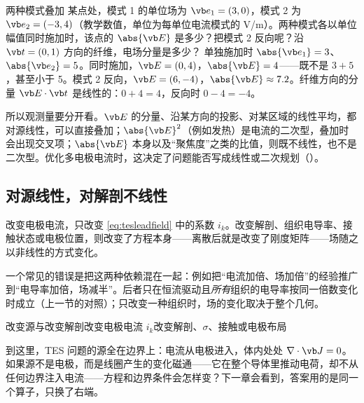 \begin{example}[unbreakable]{两种模式叠加}\label{ex:tes-superposition}
某点处，模式 1 的单位场为 $\vb e_1=(3,0)$，模式 2 为 $\vb e_2=(-3,4)$（教学数值，单位为每单位电流模式的 V/m）。两种模式各以单位幅值同时施加时，该点的 $\abs{\vb E}$ 是多少？把模式 2 反向呢？沿 $\vb t=(0,1)$ 方向的纤维，电场分量是多少？
\solution
单独施加时 $\abs{\vb e_1}=3$、$\abs{\vb e_2}=5$。同时施加，$\vb E=(0,4)$，$\abs{\vb E}=4$——既不是 $3+5$，甚至小于 5。模式 2 反向，$\vb E=(6,-4)$，$\abs{\vb E}\approx7.2$。纤维方向的分量 $\vb E\cdot\vb t$ 是线性的：$0+4=4$，反向时 $0-4=-4$。
\end{example}

所以观测量要分开看。$\vb E$ 的分量、沿某方向的投影、对某区域的线性平均，都对源线性，可以直接叠加；$\abs{\vb E}^2$（例如发热）是电流的二次型，叠加时会出现交叉项；$\abs{\vb E}$ 本身以及“聚焦度”之类的比值，则既不线性，也不是二次型。优化多电极电流时，这决定了问题能否写成线性或二次规划（）。

\subsection{对源线性，对解剖不线性}
改变电极电流，只改变 \eqref{eq:tesleadfield} 中的系数 $i_k$。改变解剖、组织电导率、接触状态或电极位置，则改变了方程本身——离散后就是改变了刚度矩阵——场随之以非线性的方式变化。

一个常见的错误是把这两种依赖混在一起：例如把“电流加倍、场加倍”的经验推广到“电导率加倍，场减半”。后者只在恒流驱动且\emph{所有}组织的电导率按同一倍数变化时成立（上一节的对照）；只改变一种组织时，场的变化取决于整个几何。

\begin{compare}{改变源与改变解剖}{改变电极电流 $i_k$}{改变解剖、$\sigma$、接触或电极布局}
\end{compare}

到这里，TES 问题的源全在边界上：电流从电极进入，体内处处 $\nabla\cdot\vb J=0$。如果源不是电极，而是线圈产生的变化磁通——它在整个导体里推动电荷，却不从任何边界注入电流——方程和边界条件会怎样变？下一章会看到，答案用的是同一个算子，只换了右端。

